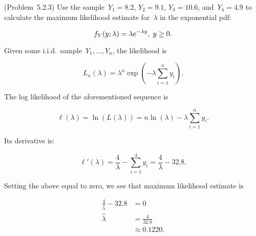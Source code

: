 \begin{problem}
  (\textnormal{Problem~5.2.3}) Use the sample~${Y_1 = 8.2}$, ${Y_2 = 9.1}$, ${Y_3 = 10.6}$, and~${Y_4 = 4.9}$ to calculate the maximum likelihood estimate for~$\lambda$ in the exponential pdf:

  \begin{equation}\label{eq:P02:Exponential}
    f_{Y}(y;\lambda) = \lambda e^{-\lambda y}, \hspace{0.1cm} y \geq 0 \text{.}
  \end{equation}
\end{problem}

Given some i.i.d.\ sample~${Y_{1},\ldots,Y_{n}}$, the likelihood is

\begin{equation}\label{eq:P02:Likelihood}
  L_{n}(\lambda) = \lambda^{n}\exp\left(-\lambda\sum_{i=1}^{n} y_{i}\right)\text{.}
\end{equation}

\noindent
The log likelihood of the aforementioned sequence is

\begin{equation}\label{eq:P02:LogLikelihood}
  \ell(\lambda) = \ln\left(L(\lambda)\right) = n\ln(\lambda) - \lambda \sum_{i=1}^{n} y_i\text{.}
\end{equation}

\noindent
Its derivative is:

\begin{equation}\label{eq:P02:LogLikelihood:Derivative}
  \ell'(\lambda) = \frac{4}{\lambda} - \sum_{i=1}^{4} y_i = \frac{4}{\lambda} - 32.8  \text{.}
\end{equation}

\noindent
Setting the above equal to zero, we see that maximum likelihood estimate is

\begin{align}
  \frac{4}{\hat{\lambda}} - 32.8 &= 0 \\
  \hat{\lambda} &= \frac{4}{32.8} \\
                &\approx \boxed{0.1220} \text{.}
\end{align}
